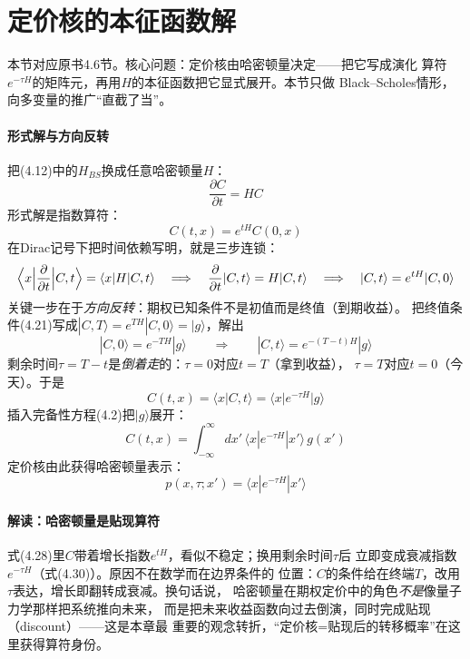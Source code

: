 \section{定价核的本征函数解}

本节对应原书4.6节。核心问题：定价核由哈密顿量决定——把它写成演化
算符$e^{-\tau H}$的矩阵元，再用$H$的本征函数把它显式展开。本节只做
Black--Scholes情形，向多变量的推广“直截了当”。

\paragraph{形式解与方向反转}
把(4.12)中的$H_{BS}$换成任意哈密顿量$H$：
\begin{equation*}
\frac{\partial C}{\partial t}=HC
\tag{4.27}
\end{equation*}
形式解是指数算符：
\begin{equation*}
C(t,x)=e^{tH}C(0,x)
\tag{4.28}
\end{equation*}
在Dirac记号下把时间依赖写明，就是三步连锁：
\begin{equation*}
\Bigl\langle x\Bigl|\frac{\partial}{\partial t}\Bigr|C,t\Bigr\rangle
=\langle x|H|C,t\rangle
\quad\Longrightarrow\quad
\frac{\partial}{\partial t}|C,t\rangle=H|C,t\rangle
\quad\Longrightarrow\quad
|C,t\rangle=e^{tH}|C,0\rangle
\end{equation*}
关键一步在于\emph{方向反转}：期权已知条件不是初值而是终值（到期收益）。
把终值条件(4.21)写成$|C,T\rangle=e^{TH}|C,0\rangle=|g\rangle$，解出
\begin{equation*}
|C,0\rangle=e^{-TH}|g\rangle
\qquad\Longrightarrow\qquad
|C,t\rangle=e^{-(T-t)H}|g\rangle
\end{equation*}
剩余时间$\tau=T-t$是\emph{倒着走}的：$\tau=0$对应$t=T$（拿到收益），
$\tau=T$对应$t=0$（今天）。于是
\begin{equation*}
C(t,x)=\langle x|C,t\rangle=\langle x|e^{-\tau H}|g\rangle
\tag{4.29}
\end{equation*}
插入完备性方程(4.2)把$|g\rangle$展开：
\begin{equation*}
C(t,x)=\int_{-\infty}^{\infty}dx'\,
\langle x|e^{-\tau H}|x'\rangle\,g(x')
\end{equation*}
定价核由此获得哈密顿量表示：
\begin{equation*}
p(x,\tau;x')=\langle x|e^{-\tau H}|x'\rangle
\tag{4.30}
\end{equation*}

\paragraph{解读：哈密顿量是贴现算符}
式(4.28)里$C$带着增长指数$e^{tH}$，看似不稳定；换用剩余时间$\tau$后
立即变成衰减指数$e^{-\tau H}$（式(4.30)）。原因不在数学而在边界条件的
位置：$C$的条件给在终端$T$，改用$\tau$表达，增长即翻转成衰减。换句话说，
哈密顿量在期权定价中的角色\emph{不是}像量子力学那样把系统推向未来，
而是把未来收益函数向过去倒演，同时完成贴现（discount）——这是本章最
重要的观念转折，“定价核=贴现后的转移概率”在这里获得算符身份。

